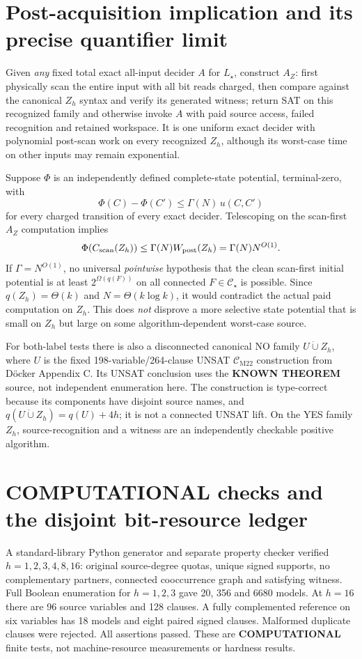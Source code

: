 \documentclass[11pt]{article}
\newcommand{\CM}{\mathcal C_{\mathrm{M22}}}
\newcommand{\Cs}{\mathcal C_\star}
\begin{document}
\section{Post-acquisition implication and its precise quantifier limit}
Given \emph{any} fixed total exact all-input decider \(A\) for \(L_\star\), construct \(A_Z\): first physically scan the entire input with all bit reads charged, then compare against the canonical \(Z_h\) syntax and verify its generated witness; return SAT on this recognized family and otherwise invoke \(A\) with paid source access, failed recognition and retained workspace. It is one uniform exact decider with polynomial post-scan work on every recognized \(Z_h\), although its worst-case time on other inputs may remain exponential.

Suppose \(\Phi\) is an independently defined complete-state potential, terminal-zero, with
\[
\Phi(C)-\Phi(C')\le\Gamma(N)\,u(C,C')
\]
for every charged transition of every exact decider. Telescoping on the scan-first \(A_Z\) computation implies
\[
\Phi(C_{\rm scan}(Z_h))\le\Gamma(N)W_{\rm post}(Z_h)
=\Gamma(N)N^{O(1)}.
\]
If \(\Gamma=N^{O(1)}\), no universal \emph{pointwise} hypothesis that the clean scan-first initial potential is at least \(2^{\Omega(q(F))}\) on all connected \(F\in\Cs\) is possible. Since \(q(Z_h)=\Theta(k)\) and \(N=\Theta(k\log k)\), it would contradict the actual paid computation on \(Z_h\). This does \emph{not} disprove a more selective state potential that is small on \(Z_h\) but large on some algorithm-dependent worst-case source.

For both-label tests there is also a disconnected canonical NO family \(U\dot\cup Z_h\), where \(U\) is the fixed 198-variable/264-clause UNSAT \(\CM\) construction from D\"ocker Appendix C. Its UNSAT conclusion uses the \textbf{KNOWN THEOREM} source, not independent enumeration here. The construction is type-correct because its components have disjoint source names, and \(q(U\dot\cup Z_h)=q(U)+4h\); it is not a connected UNSAT lift. On the YES family \(Z_h\), source-recognition and a witness are an independently checkable positive algorithm.

\section{COMPUTATIONAL checks and the disjoint bit-resource ledger}
A standard-library Python generator and separate property checker verified \(h=1,2,3,4,8,16\): original source-degree quotas, unique signed supports, no complementary partners, connected cooccurrence graph and satisfying witness. Full Boolean enumeration for \(h=1,2,3\) gave 20, 356 and 6680 models. At \(h=16\) there are 96 source variables and 128 clauses. A fully complemented reference on six variables has 18 models and eight paired signed clauses. Malformed duplicate clauses were rejected. All assertions passed. These are \textbf{COMPUTATIONAL} finite tests, not machine-resource measurements or hardness results.
\end{document}
